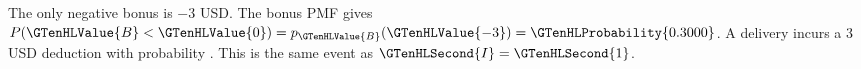 The only negative bonus is $-3$ USD. The bonus PMF gives $P(\GTenHLValue{B}<\GTenHLValue{0})=p_{\GTenHLValue{B}}(\GTenHLValue{-3})=\GTenHLProbability{0.3000}$. A delivery incurs a 3 USD deduction with probability . This is the same event as $\GTenHLSecond{I}=\GTenHLSecond{1}$.



